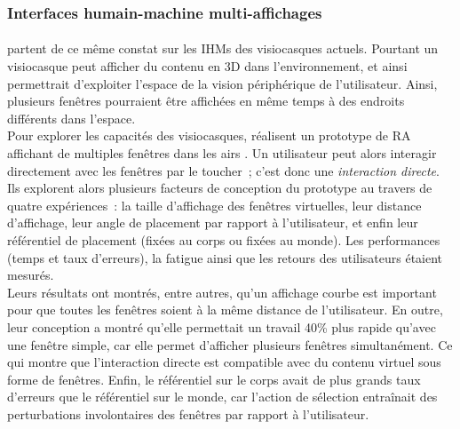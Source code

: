 \subsubsection*{Interfaces humain-machine multi-affichages}

\paragraph*{}
\citet{EnsFinneganIrani2014} partent de ce même constat sur les IHMs des visiocasques actuels. Pourtant un visiocasque peut afficher du contenu en 3D dans l'environnement, et ainsi permettrait d'exploiter l'espace de la vision périphérique de l'utilisateur. Ainsi, plusieurs fenêtres pourraient être affichées en même temps à des endroits différents dans l'espace.\\
Pour explorer les capacités des visiocasques, \citeauthor{EnsFinneganIrani2014} réalisent un prototype de RA affichant de multiples fenêtres dans les airs . Un utilisateur peut alors interagir directement avec les fenêtres par le toucher~; c'est donc une \emph{interaction directe}. Ils explorent alors plusieurs facteurs de conception du prototype au travers de quatre expériences~: la taille d'affichage des fenêtres virtuelles, leur distance d'affichage, leur angle de placement par rapport à l'utilisateur, et enfin leur référentiel de placement (fixées au corps ou fixées au monde). Les performances (temps et taux d'erreurs), la fatigue ainsi que les retours des utilisateurs étaient mesurés.\\ 
Leurs résultats ont montrés, entre autres, qu'un affichage courbe est important pour que toutes les fenêtres soient à la même distance de l'utilisateur. En outre, leur conception a montré qu'elle permettait un travail 40\% plus rapide qu'avec une fenêtre simple, car elle permet d'afficher plusieurs fenêtres simultanément. Ce qui montre que l'interaction directe est compatible avec du contenu virtuel sous forme de fenêtres. Enfin, le référentiel sur le corps avait de plus grands taux d'erreurs que le référentiel sur le monde, car l'action de sélection entraînait des perturbations involontaires des fenêtres par rapport à l'utilisateur.\\ 
